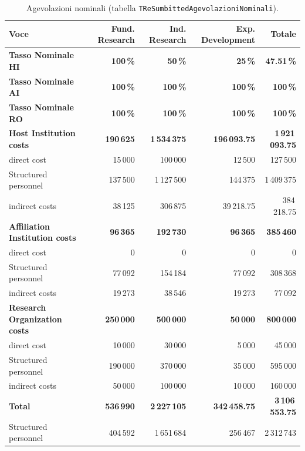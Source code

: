 \documentclass{plan4ari_report}
\begin{document}
\begin{table}[H]\centering\small
\caption{Agevolazioni nominali (tabella \texttt{TReSumbittedAgevolazioniNominali}).}\label{tab:age-nom}
\begin{tabular}{lrrrr}\toprule
\textbf{Voce} & \textbf{Fund. Research} & \textbf{Ind. Research} & \textbf{Exp. Development} & \textbf{Totale} \\\midrule
\textbf{Tasso Nominale HI} & \textbf{100\,\%} & \textbf{50\,\%} & \textbf{25\,\%} & \textbf{47.51\,\%} \\
\textbf{Tasso Nominale AI} & \textbf{100\,\%} & \textbf{100\,\%} & \textbf{100\,\%} & \textbf{100\,\%} \\
\textbf{Tasso Nominale RO} & \textbf{100\,\%} & \textbf{100\,\%} & \textbf{100\,\%} & \textbf{100\,\%} \\
\textbf{Host Institution costs} & \textbf{190\,625} & \textbf{1\,534\,375} & \textbf{196\,093.75} & \textbf{1\,921\,093.75} \\
\quad direct cost & 15\,000 & 100\,000 & 12\,500 & 127\,500 \\
\quad Structured personnel & 137\,500 & 1\,127\,500 & 144\,375 & 1\,409\,375 \\
\quad indirect costs & 38\,125 & 306\,875 & 39\,218.75 & 384\,218.75 \\
\textbf{Affiliation Institution costs} & \textbf{96\,365} & \textbf{192\,730} & \textbf{96\,365} & \textbf{385\,460} \\
\quad direct cost & 0 & 0 & 0 & 0 \\
\quad Structured personnel & 77\,092 & 154\,184 & 77\,092 & 308\,368 \\
\quad indirect costs & 19\,273 & 38\,546 & 19\,273 & 77\,092 \\
\textbf{Research Organization costs} & \textbf{250\,000} & \textbf{500\,000} & \textbf{50\,000} & \textbf{800\,000} \\
\quad direct cost & 10\,000 & 30\,000 & 5\,000 & 45\,000 \\
\quad Structured personnel & 190\,000 & 370\,000 & 35\,000 & 595\,000 \\
\quad indirect costs & 50\,000 & 100\,000 & 10\,000 & 160\,000 \\
\midrule
\textbf{Total} & \textbf{536\,990} & \textbf{2\,227\,105} & \textbf{342\,458.75} & \textbf{3\,106\,553.75} \\
\quad Structured personnel & 404\,592 & 1\,651\,684 & 256\,467 & 2\,312\,743 \\
\bottomrule\end{tabular}
\end{table}
\end{document}
